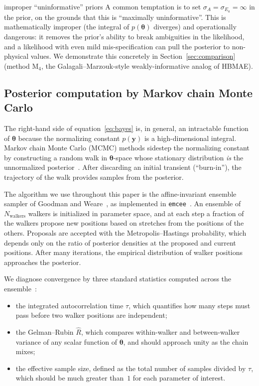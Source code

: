 \documentclass[12pt]{article}
\theoremstyle{plain}
\theoremstyle{definition}
\theoremstyle{remark}
\newcommand{\HBMAE}{HBMAE\xspace}
\begin{document}
\begin{pitfall}{improper ``uninformative'' priors}
A common temptation is to set $\sigma_A = \sigma_{E_a} = \infty$ in the
prior, on the grounds that this is ``maximally uninformative''.  This is
mathematically improper (the integral of $p(\boldsymbol{\theta})$ diverges)
and operationally dangerous: it removes the prior's ability to break
ambiguities in the likelihood, and a likelihood with even mild
mis-specification can pull the posterior to non-physical values.  We
demonstrate this concretely in Section~\ref{sec:comparison} (method M$_4$,
the Galagali--Marzouk-style weakly-informative analog of \HBMAE).
\end{pitfall}

\subsection{Posterior computation by Markov chain Monte Carlo}\label{sec:bg:mcmc}

The right-hand side of equation~\eqref{eq:bayes} is, in general, an
intractable function of $\boldsymbol{\theta}$ because the normalizing
constant $p(\mathbf{y})$ is a high-dimensional integral.  Markov chain Monte
Carlo (MCMC) methods sidestep the normalizing constant by constructing a
random walk in $\boldsymbol{\theta}$-space whose stationary distribution
\emph{is} the unnormalized posterior~\citep{Tierney1994,vdVaart1998}.  After
discarding an initial transient (``burn-in''), the trajectory of the walk
provides samples from the posterior.

The algorithm we use throughout this paper is the affine-invariant ensemble
sampler of Goodman and Weare~\citep{GoodmanWeare2010}, as implemented in
\texttt{emcee}~\citep{ForemanMackey2013}.  An ensemble of $N_{\mathrm{walkers}}$
walkers is initialized in parameter space, and at each step a fraction of the
walkers propose new positions based on stretches from the positions of the
others.  Proposals are accepted with the Metropolis--Hastings probability,
which depends only on the ratio of posterior densities at the proposed and
current positions.  After many iterations, the empirical distribution of
walker positions approaches the posterior.

We diagnose convergence by three standard statistics computed across the
ensemble~\citep{Vehtari2017}:
\begin{itemize}
\item the integrated autocorrelation time $\tau$, which quantifies how many
steps must pass before two walker positions are independent;
\item the Gelman--Rubin $\widehat{R}$, which compares within-walker and
between-walker variance of any scalar function of $\boldsymbol{\theta}$, and
should approach unity as the chain mixes;
\item the effective sample size, defined as the total number of samples
divided by $\tau$, which should be much greater than~$1$ for each parameter
of interest.
\end{itemize}
\end{document}
